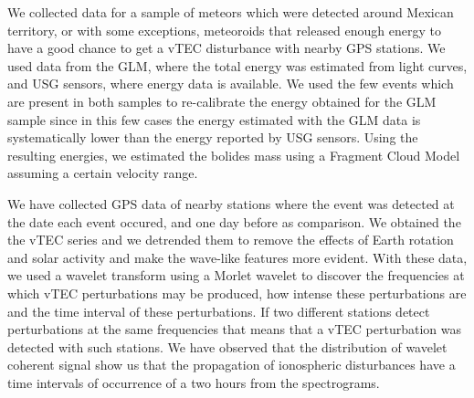 We collected data for a sample of meteors which were detected around Mexican territory, or with some exceptions, meteoroids that released enough energy to have a good chance to get a vTEC disturbance with nearby GPS stations. We used data from the GLM, where the total energy was estimated from light curves, and USG sensors, where energy data is available. We used the few events which are present in both samples to re-calibrate the energy obtained for the GLM sample since in this few cases the energy estimated with the GLM data is systematically lower than the energy reported by USG sensors. Using the resulting energies, we estimated the bolides mass using a Fragment Cloud Model assuming a certain velocity range. 

We have collected GPS data of nearby stations where the event was detected at the date each event occured, and one day before as comparison. We obtained the the vTEC series and we detrended them to remove the effects of Earth rotation and solar activity and make the wave-like features more evident. With these data, we used a wavelet transform using a Morlet wavelet to discover the frequencies at which vTEC perturbations may be produced, how intense these perturbations are and the time interval of these perturbations. If two different stations detect perturbations at the same frequencies that means that a vTEC perturbation was detected with such stations. We have observed that the distribution of wavelet coherent signal show us that the propagation of ionospheric disturbances have a time intervals of occurrence of a two hours from the spectrograms. 
